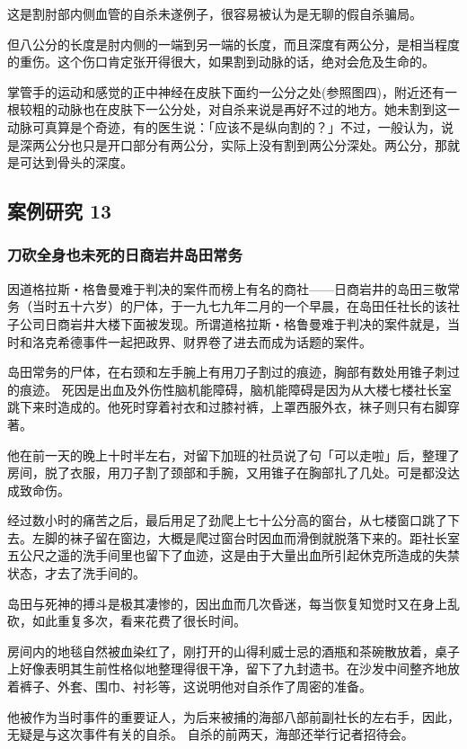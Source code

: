 \documentclass[UTF8]{ctexart}
\begin{document}
这是割肘部内侧血管的自杀未遂例子，很容易被认为是无聊的假自杀骗局。

但八公分的长度是肘内侧的一端到另一端的长度，而且深度有两公分，是相当程度的重伤。这个伤口肯定张开得很大，如果割到动脉的话，绝对会危及生命的。

掌管手的运动和感觉的正中神经在皮肤下面约一公分之处(参照图四)，附近还有一根较粗的动脉也在皮肤下一公分处，对自杀来说是再好不过的地方。她未割到这一动脉可真算是个奇迹，有的医生说：「应该不是纵向割的？」不过，一般认为，说是深两公分也只是开口部分有两公分，实际上没有割到两公分深处。两公分，那就是可达到骨头的深度。

\subsection{案例研究 13}
\subsubsection*{刀砍全身也未死的日商岩井岛田常务}

因道格拉斯‧格鲁曼难于判决的案件而榜上有名的商社——日商岩井的岛田三敬常务（当时五十六岁）的尸体，于一九七九年二月的一个早晨，在岛田任社长的该社子公司日商岩井大楼下面被发现。所谓道格拉斯‧格鲁曼难于判决的案件就是，当时和洛克希德事件一起把政界、财界卷了进去而成为话题的案件。

岛田常务的尸体，在右颈和左手腕上有用刀子割过的痕迹，胸部有数处用锥子刺过的痕迹。 死因是出血及外伤性脑机能障碍，脑机能障碍是因为从大楼七楼社长室跳下来时造成的。他死时穿着衬衣和过膝衬裤，上罩西服外衣，袜子则只有右脚穿著。

他在前一天的晚上十时半左右，对留下加班的社员说了句「可以走啦」后，整理了房间，脱了衣服，用刀子割了颈部和手腕，又用锥子在胸部扎了几处。可是都没达成致命伤。

经过数小时的痛苦之后，最后用足了劲爬上七十公分高的窗台，从七楼窗口跳了下去。左脚的袜子留在窗边，大概是爬过窗台时因血而滑倒就脱落下来的。距社长室五公尺之遥的洗手间里也留下了血迹，这是由于大量出血所引起休克所造成的失禁状态，才去了洗手间的。

岛田与死神的搏斗是极其凄惨的，因出血而几次昏迷，每当恢复知觉时又在身上乱砍，如此重复多次，看来花费了很长时间。

房间内的地毯自然被血染红了，刚打开的山得利威士忌的酒瓶和茶碗散放着，桌子上好像表明其生前性格似地整理得很干净，留下了九封遗书。在沙发中间整齐地放着裤子、外套、围巾、衬衫等，这说明他对自杀作了周密的准备。

他被作为当时事件的重要证人，为后来被捕的海部八部前副社长的左右手，因此，无疑是与这次事件有关的自杀。
自杀的前两天，海部还举行记者招待会。
\end{document}
